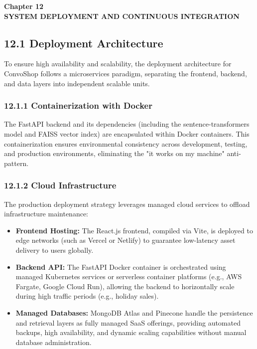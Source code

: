 \newpage
\begin{center}
{\fontsize{14}{17}\bfseries Chapter 12\\[6pt]}
{\fontsize{16}{20}\bfseries SYSTEM DEPLOYMENT AND CONTINUOUS INTEGRATION\\[10pt]}
\end{center}

\subsection*{12.1 Deployment Architecture}
To ensure high availability and scalability, the deployment architecture for ConvoShop follows a microservices paradigm, separating the frontend, backend, and data layers into independent scalable units.

\subsubsection*{12.1.1 Containerization with Docker}
The FastAPI backend and its dependencies (including the sentence-transformers model and FAISS vector index) are encapsulated within Docker containers. This containerization ensures environmental consistency across development, testing, and production environments, eliminating the "it works on my machine" anti-pattern. 

\subsubsection*{12.1.2 Cloud Infrastructure}
The production deployment strategy leverages managed cloud services to offload infrastructure maintenance:
\begin{itemize}
    \item \textbf{Frontend Hosting:} The React.js frontend, compiled via Vite, is deployed to edge networks (such as Vercel or Netlify) to guarantee low-latency asset delivery to users globally.
    \item \textbf{Backend API:} The FastAPI Docker container is orchestrated using managed Kubernetes services or serverless container platforms (e.g., AWS Fargate, Google Cloud Run), allowing the backend to horizontally scale during high traffic periods (e.g., holiday sales).
    \item \textbf{Managed Databases:} MongoDB Atlas and Pinecone handle the persistence and retrieval layers as fully managed SaaS offerings, providing automated backups, high availability, and dynamic scaling capabilities without manual database administration.
\end{itemize}

